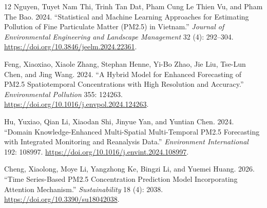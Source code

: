 \documentclass[11pt]{article}
\begin{document}
\begin{thebibliography}{12}
 Nguyen, Tuyet Nam Thi, Trinh Tan Dat, Pham Cung Le Thien Vu, and Pham The Bao. 2024. ``Statistical and Machine Learning Approaches for Estimating Pollution of Fine Particulate Matter (PM2.5) in Vietnam.'' \textit{Journal of Environmental Engineering and Landscape Management} 32 (4): 292--304. \url{https://doi.org/10.3846/jeelm.2024.22361}.

 Feng, Xiaoxiao, Xiaole Zhang, Stephan Henne, Yi-Bo Zhao, Jie Liu, Tse-Lun Chen, and Jing Wang. 2024. ``A Hybrid Model for Enhanced Forecasting of PM2.5 Spatiotemporal Concentrations with High Resolution and Accuracy.'' \textit{Environmental Pollution} 355: 124263. \url{https://doi.org/10.1016/j.envpol.2024.124263}.

 Hu, Yuxiao, Qian Li, Xiaodan Shi, Jinyue Yan, and Yuntian Chen. 2024. ``Domain Knowledge-Enhanced Multi-Spatial Multi-Temporal PM2.5 Forecasting with Integrated Monitoring and Reanalysis Data.'' \textit{Environment International} 192: 108997. \url{https://doi.org/10.1016/j.envint.2024.108997}.

 Cheng, Xiaolong, Moye Li, Yangzhong Ke, Bingzi Li, and Yuemei Huang. 2026. ``Time Series-Based PM2.5 Concentration Prediction Model Incorporating Attention Mechanism.'' \textit{Sustainability} 18 (4): 2038. \url{https://doi.org/10.3390/su18042038}.
\end{thebibliography}
\end{document}

